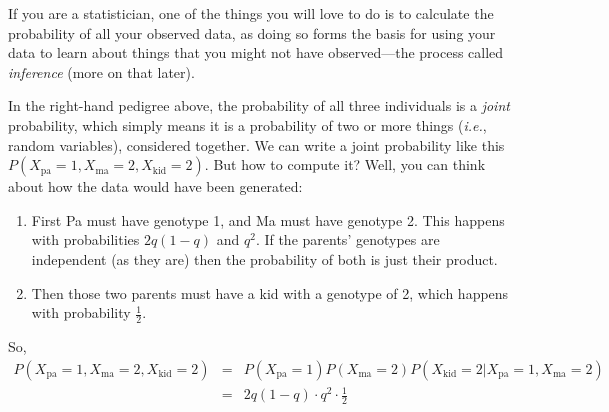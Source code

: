 \documentclass[11pt]{article}
\newcommand{\kid}{\mathrm{kid}}
\newcommand{\ma}{\mathrm{ma}}
\newcommand{\pa}{\mathrm{pa}}
\newcommand{\ie}{{\em i.e.},\xspace }
\begin{document}
If you are a statistician, one of the things you will love to do is to calculate the probability
of all your observed data, as doing so forms the basis for using your data to learn about things
that you might not have observed---the process called {\em inference} (more on that later).  

In the right-hand pedigree above, the probability of all three individuals is a {\em joint}
probability, which simply means it is a probability of two or more things (\ie random variables),
considered together. We can write a joint probability like this $P(X_\pa = 1, X_\ma = 2, X_\kid = 2)$.
But how to compute it?  Well, you can think about how the data would have been generated:
\begin{enumerate}
\item First Pa must have genotype 1, and Ma must have genotype 2.  This happens with
probabilities $2q(1-q)$ and $q^2$.
If the parents' genotypes are independent (as they are) then the probability of both
is just their product.
\item Then those two parents must have a kid with a genotype of 2, which happens with 
probability $\frac{1}{2}$. 
\end{enumerate}
So,
\begin{eqnarray*}
P(X_\pa = 1, X_\ma = 2, X_\kid = 2) & = & P(X_\pa = 1) P(X_\ma = 2) P(X_\kid = 2 | X_\pa = 1, X_\ma = 2) \\
& = & 2q(1-q) \cdot q^2 \cdot \frac{1}{2}
\end{eqnarray*}
\end{document}
